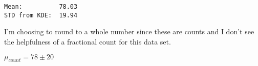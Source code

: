 \documentclass{article}
\begin{document}
    \begin{Verbatim}[commandchars=\\\{\}]
Mean:          78.03
STD from KDE:  19.94
    \end{Verbatim}

    I'm choosing to round to a whole number since these are counts and I
don't see the helpfulness of a fractional count for this data set.

$\mu_{count} = 78 \pm 20$





    
\end{document}
